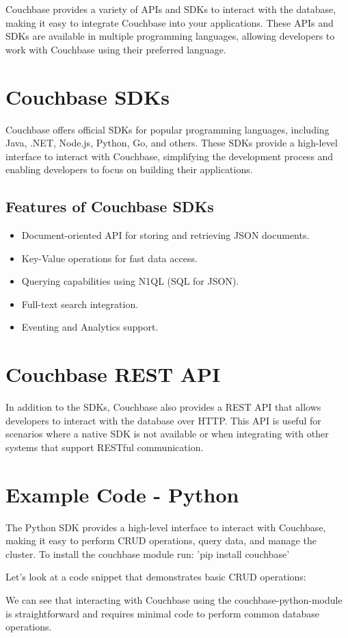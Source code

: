 Couchbase provides a variety of APIs and SDKs to interact with the database, making it easy to integrate Couchbase into your applications. These APIs and SDKs are available in multiple programming languages, allowing developers to work with Couchbase using their preferred language.

\section{Couchbase SDKs}
Couchbase offers official SDKs for popular programming languages, including Java, .NET, Node.js, Python, Go, and others. These SDKs provide a high-level interface to interact with Couchbase, simplifying the development process and enabling developers to focus on building their applications. \cite{couchbaseSDKs}

\subsection{Features of Couchbase SDKs}
\begin{itemize}
  \item Document-oriented API for storing and retrieving JSON documents.
  \item Key-Value operations for fast data access.
  \item Querying capabilities using N1QL (SQL for JSON).
  \item Full-text search integration.
  \item Eventing and Analytics support.
\end{itemize}


\section{Couchbase REST API}
In addition to the SDKs, Couchbase also provides a REST API that allows developers to interact with the database over HTTP. This API is useful for scenarios where a native SDK is not available or when integrating with other systems that support RESTful communication.


\section{Example Code - Python}
The Python SDK provides a high-level interface to interact with Couchbase, making it easy to perform CRUD operations, query data, and manage the cluster. To install the couchbase module run: 'pip install couchbase'
\cite{couchbasePythonModule}

Let's look at a code snippet that demonstrates basic CRUD operations:


We can see that interacting with Couchbase using the couchbase-python-module is straightforward and requires minimal code to perform common database operations.
